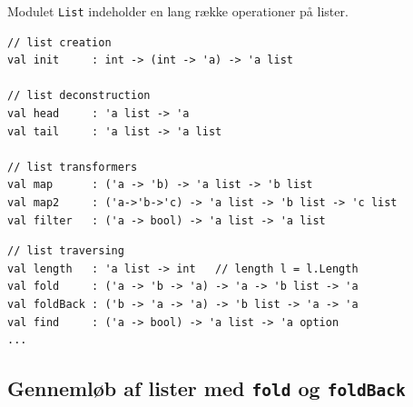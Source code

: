 \documentclass[rgb]{beamer}
\begin{document}
\begin{frame}[fragile]
\begin{footnotesize}


\vspace{1ex}

Modulet \lstinline{List} indeholder en lang række operationer på
lister.

\begin{lstlisting}[numbers=none,frame=none]
// list creation
val init     : int -> (int -> 'a) -> 'a list

// list deconstruction
val head     : 'a list -> 'a
val tail     : 'a list -> 'a list

// list transformers
val map      : ('a -> 'b) -> 'a list -> 'b list
val map2     : ('a->'b->'c) -> 'a list -> 'b list -> 'c list
val filter   : ('a -> bool) -> 'a list -> 'a list
\end{lstlisting}

\begin{lstlisting}[numbers=none]
// list traversing
val length   : 'a list -> int   // length l = l.Length
val fold     : ('a -> 'b -> 'a) -> 'a -> 'b list -> 'a
val foldBack : ('b -> 'a -> 'a) -> 'b list -> 'a -> 'a
val find     : ('a -> bool) -> 'a list -> 'a option
...
\end{lstlisting}
\end{footnotesize}

\end{frame}

\subsection{Gennemløb af lister med \lstinline{fold} og \lstinline{foldBack}}
\end{document}
